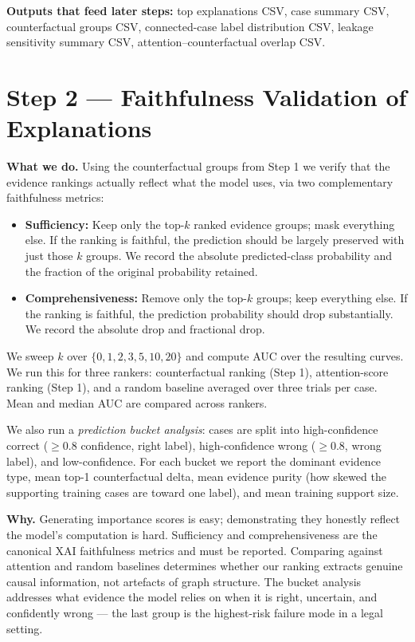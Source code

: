 \documentclass[11pt,a4paper]{article}
\begin{document}
\textbf{Outputs that feed later steps:} top explanations CSV, case summary CSV,
counterfactual groups CSV, connected-case label distribution CSV, leakage sensitivity
summary CSV, attention--counterfactual overlap CSV.

\bigskip

\section{Step 2 \texorpdfstring{\textcolor{stepgray}{---}}{---} Faithfulness Validation of Explanations}

\textbf{What we do.}
Using the counterfactual groups from Step 1 we verify that the evidence rankings
actually reflect what the model uses, via two complementary faithfulness metrics:
\begin{itemize}
  \item \textbf{Sufficiency:} Keep only the top-$k$ ranked evidence groups; mask
    everything else. If the ranking is faithful, the prediction should be largely
    preserved with just those $k$ groups. We record the absolute predicted-class
    probability and the fraction of the original probability retained.
  \item \textbf{Comprehensiveness:} Remove only the top-$k$ groups; keep everything
    else. If the ranking is faithful, the prediction probability should drop
    substantially. We record the absolute drop and fractional drop.
\end{itemize}
We sweep $k$ over $\{0,1,2,3,5,10,20\}$ and compute AUC over the resulting curves.
We run this for three rankers: counterfactual ranking (Step 1), attention-score
ranking (Step 1), and a random baseline averaged over three trials per case. Mean
and median AUC are compared across rankers.

We also run a \emph{prediction bucket analysis}: cases are split into high-confidence
correct ($\geq$0.8 confidence, right label), high-confidence wrong ($\geq$0.8,
wrong label), and low-confidence. For each bucket we report the dominant evidence
type, mean top-1 counterfactual delta, mean evidence purity (how skewed the supporting
training cases are toward one label), and mean training support size.

\textbf{Why.}
Generating importance scores is easy; demonstrating they honestly reflect the model's
computation is hard. Sufficiency and comprehensiveness are the canonical XAI
faithfulness metrics and must be reported. Comparing against attention and random
baselines determines whether our ranking extracts genuine causal information, not
artefacts of graph structure. The bucket analysis addresses what evidence the model
relies on when it is right, uncertain, and confidently wrong --- the last group is
the highest-risk failure mode in a legal setting.
\end{document}
